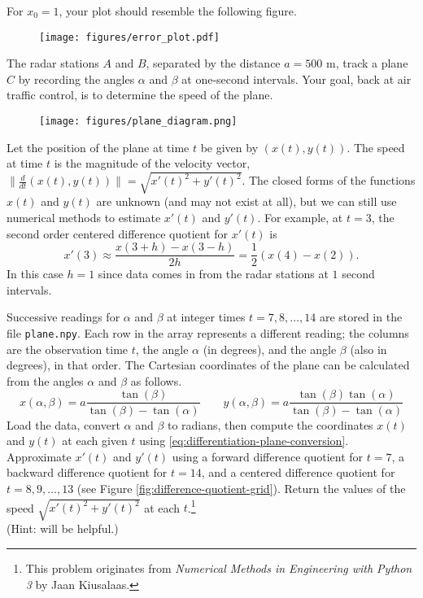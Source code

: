 For $x_0 = 1$, your plot should resemble the following figure.
\begin{figure}[H]
    \centering
    \texttt{[image: figures/error\_plot.pdf]}
\end{figure}
\label{prob:difference-quotient-convergence}

The radar stations $A$ and $B$, separated by the distance $a = 500$ m, track a plane $C$ by recording the angles $\alpha$ and $\beta$ at one-second intervals.
Your goal, back at air traffic control, is to determine the speed of the plane.
%
\begin{figure}[H]
    \texttt{[image: figures/plane\_diagram.png]}
\end{figure}
%
Let the position of the plane at time $t$ be given by $(x(t),y(t))$.
The speed at time $t$ is the magnitude of the velocity vector, $\|\frac{d}{dt}(x(t),y(t))\| = \sqrt{x'(t)^2 + y'(t)^2}$.
The closed forms of the functions $x(t)$ and $y(t)$ are unknown (and may not exist at all), but we can still use numerical methods to estimate $x'(t)$ and $y'(t)$.
For example, at $t=3$, the second order centered difference quotient for $x'(t)$ is
\[
x'(3) \approx \frac{x(3+h) - x(3-h)}{2h} = \frac{1}{2}(x(4) - x(2)).
\]
In this case $h=1$ since data comes in from the radar stations at $1$ second intervals.

Successive readings for $\alpha$ and $\beta$ at integer times $t=7,8,\ldots,14$ are stored in the file \texttt{plane.npy}.
Each row in the array represents a different reading; the columns are the observation time $t$, the angle $\alpha$ (in degrees), and the angle $\beta$ (also in degrees), in that order.
The Cartesian coordinates of the plane can be calculated from the angles $\alpha$ and $\beta$ as follows.
\begin{equation}
\label{eq:differentiation-plane-conversion}
x(\alpha, \beta) = a \frac{\tan(\beta)}{\tan(\beta)-\tan(\alpha)}
\qquad
y(\alpha, \beta) = a \frac{\tan(\beta)\tan(\alpha)}{\tan(\beta)-\tan(\alpha)}
\end{equation}
Load the data, convert $\alpha$ and $\beta$ to radians, then compute the coordinates $x(t)$ and $y(t)$ at each given $t$ using \ref{eq:differentiation-plane-conversion}.
Approximate $x'(t)$ and $y'(t)$ using a forward difference quotient for $t=7$, a backward difference quotient for $t=14$, and a centered difference quotient for $t=8,9,\ldots,13$ (see Figure \ref{fig:difference-quotient-grid}).
Return the values of the speed $\sqrt{x'(t)^2+y'(t)^2}$ at each $t$.\footnote{This problem originates from \emph{Numerical Methods in Engineering with Python 3} by Jaan Kiusalaas.}
\\(Hint:  will be helpful.)


